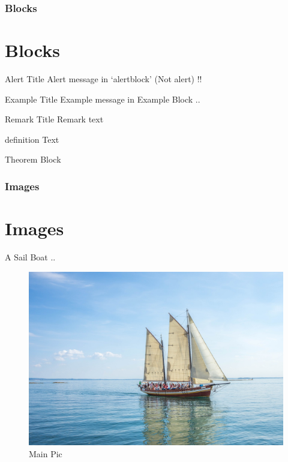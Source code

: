 \documentclass[12pt,[aspectratio=169]{beamer}
\begin{document}
\begin{frame}
    \frametitle{Blocks}
    \section{Blocks}
    \begin{alertblock}{Alert Title}
        Alert message in `alertblock' (Not alert) !!
    \end{alertblock}
    
    \begin{example}{Example Title}
        Example message in Example Block ..
    \end{example}
    
    \begin{block}{Remark Title}
        Remark text
    \end{block}

    \begin{definition}
        definition Text
    \end{definition}
    
    \begin{theorem}
        Theorem Block
    \end{theorem}
\end{frame}

\begin{frame}[label=images,shrink=5]
    \frametitle{Images}
    \section{Images}
    A Sail Boat ..
    \begin{figure}
        \centering
        \includegraphics[width=0.8\linewidth]{boat.jpg}
        \caption{Main Pic}
        \label{fig:main}
    \end{figure}
\end{frame}
\end{document}
